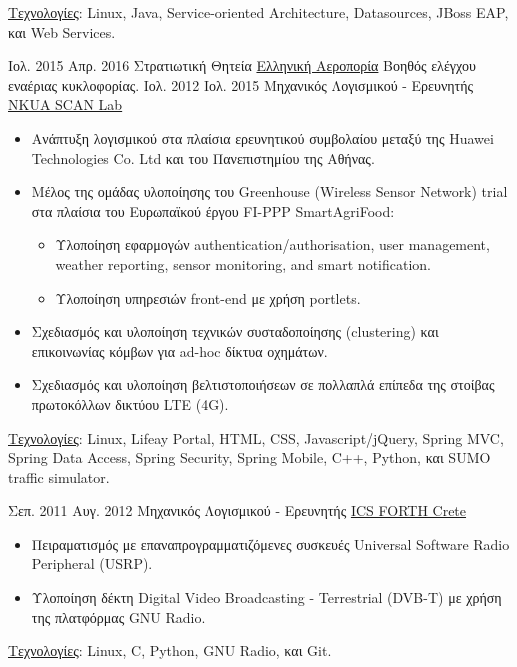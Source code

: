 \documentclass[letterpaper]{style/twentysecondcv} %
\begin{document}
\begin{twenty}
{\begin{itemize}
			\end{itemize}%
			\vspace{0.5em}
			\underline{Τεχνολογίες}: Linux, Java, Service-oriented Architecture, Datasources, JBoss EAP, και Web Services.
			\vspace{1.0em}
		}
	\twentyplusitem
		{\phantom{ } Ιολ. 2015}
		{Απρ. 2016}
		{Στρατιωτική Θητεία}
		{\href{https://www.haf.gr/en/}{Ελληνική Αεροπορία}}
		{}
		{%
			Βοηθός ελέγχου εναέριας κυκλοφορίας.
			\vspace{1.0em}
		}
	\twentyplusitem
		{\phantom{ } Ιολ. 2012}
		{\phantom{ } Ιολ. 2015}
		{Μηχανικός Λογισμικού - Ερευνητής}
		{\href{http://scan.di.uoa.gr/}{NKUA SCAN Lab}}
		{}
		{%
			\begin{itemize}
				\item Ανάπτυξη λογισμικού στα πλαίσια ερευνητικού συμβολαίου μεταξύ της Huawei Technologies Co. Ltd και του Πανεπιστημίου της Αθήνας.
				\item Μέλος της ομάδας υλοποίησης του Greenhouse (Wireless Sensor Network) trial στα πλαίσια του Ευρωπαϊκού έργου FI-PPP SmartAgriFood:
				\begin{itemize}
					\item Υλοποίηση εφαρμογών authentication/authorisation, user management, weather reporting, sensor monitoring, and smart notification.
					\item Υλοποίηση υπηρεσιών front-end με χρήση portlets.
				\end{itemize}%
				\item Σχεδιασμός και υλοποίηση τεχνικών συσταδοποίησης (clustering) και επικοινωνίας κόμβων για ad-hoc δίκτυα οχημάτων.
				\item Σχεδιασμός και υλοποίηση βελτιστοποιήσεων σε πολλαπλά επίπεδα της στοίβας πρωτοκόλλων δικτύου LTE (4G).
			\end{itemize}%
			\vspace{0.5em}
			\underline{Τεχνολογίες}: Linux, Lifeay Portal, HTML, CSS, Javascript/jQuery, Spring MVC, Spring Data Access, Spring Security, Spring Mobile, C++, Python, και SUMO traffic simulator.
			\vspace{1.0em}
		}
	\twentyplusitem
		{\phantom{ }Σεπ. 2011}
		{\phantom{\addthinspace}Αυγ. 2012}
		{Μηχανικός Λογισμικού - Ερευνητής}
		{\href{https://www.ics.forth.gr/}{ICS FORTH Crete}}
		{}
		{%
			\begin{itemize}
				\item Πειραματισμός με επαναπρογραμματιζόμενες συσκευές Universal Software Radio Peripheral (USRP).
				\item Υλοποίηση δέκτη Digital Video Broadcasting - Terrestrial (DVB-T) με χρήση της πλατφόρμας GNU Radio.
			\end{itemize}%
			\vspace{0.5em}
			\underline{Τεχνολογίες}: Linux, C, Python, GNU Radio, και Git.
		}
\end{twenty}
\end{document}
